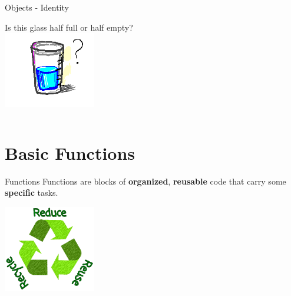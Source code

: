     \begin{frame}{Objects - Identity}
        \begin{center}
            \Large
            Is this glass half full or half empty?
            \\
            \includegraphics[width=0.30\textwidth]{images/glass.png}
            \pause
            \inputminted[frame=single,framesep=2pt, firstline=6]{python3}{code-examples/identity.py}
            \pause
        \end{center}
    \end{frame}

    \section{Basic Functions}
        \begin{frame}[c]{Functions}
            \LARGE
            Functions are blocks of
            \pause
            \textbf{organized},
            \pause
            \textbf{reusable} code
            \pause that carry some \textbf{specific} tasks.\\
            \pause
            \begin{center}
                \includegraphics[width=0.3\textwidth]{images/reduce_reuse_recycle.png}
            \end{center}
        \end{frame}

